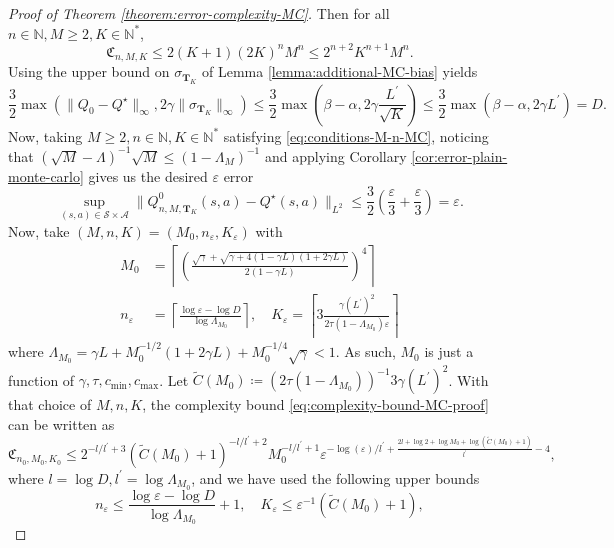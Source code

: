 \documentclass[11pt]{article}
\numberwithin{equation}{section}
\theoremstyle{definition}
\theoremstyle{remark}
\def\cA{\mathcal{A}}
\def\cS{\mathcal{S}}
\def\N{{\mathbb{N}}}
\begin{document}
\begin{proof}[Proof of Theorem \ref{theorem:error-complexity-MC}]
Then for all $n \in \N,M \geq 2, K \in \N^*$,
    \begin{equation}
    \label{eq:complexity-bound-MC-proof}
    \mathfrak C_{n,M,K} \leq 2(K + 1)(2 K)^n M^n \leq 2^{n+2}K^{n + 1}M^{n}.
    \end{equation}
     Using the upper bound on $\sigma_{\mathbf T_K}$ of Lemma \ref{lemma:additional-MC-bias} yields
    \[
\frac{3}{2}\max\left( \| Q_0 - Q^\star\|_{\infty},  2\gamma \| \sigma_{\mathbf T_K} \|_{\infty} \right) \leq \frac{3}{2} \max \left( \beta - \alpha, 2 \gamma \frac{L^\prime}{\sqrt{K}} \right) \leq \frac{3}{2} \max \left( \beta - \alpha, 2 \gamma L^\prime \right) = D.
    \]
    Now, taking $M \geq 2, n \in \N, K \in \N^*$ satisfying \eqref{eq:conditions-M-n-MC}, noticing that $(\sqrt{M} - \Lambda)^{-1}\sqrt{M} \leq (1 - \Lambda_M)^{-1}$ and applying Corollary \ref{cor:error-plain-monte-carlo} gives us the desired $\varepsilon$ error
    \[
    \sup_{(s,a) \in \cS \times \cA} \| Q^0_{n,M, \mathbf{T}_{K}}(s,a) - Q^\star(s,a) \|_{L^2} \leq \frac{3}{2}\left(\frac{\varepsilon}{3} + \frac{\varepsilon}{3}\right) =\varepsilon.
    \]
    Now, take $(M,n,K) = (M_0,n_\varepsilon,K_\varepsilon)$ with
    \[
    \begin{aligned}
        M_0 &= \left\lceil \left(\frac{\sqrt{\gamma} + \sqrt{\gamma + 4(1 - \gamma L)(1 + 2\gamma L)}}{2(1- \gamma L)} \right)^4 \right\rceil \\
        n_\varepsilon &= \left\lceil  \frac{\log \varepsilon - \log D}{\log \Lambda_{M_0}}\right\rceil, \quad  
        K_\varepsilon = \left\lceil 3 \frac{\gamma (L^\prime)^2}{2 \tau (1 - \Lambda_{M_0}) \varepsilon} \right\rceil
    \end{aligned}
    \]
    where $\Lambda_{M_0} = \gamma L + M_0^{-1/2}(1 + 2 \gamma L) + M_0^{-1/4}\sqrt{\gamma} < 1$. 
    As such, $M_0$ is just a function of $\gamma, \tau, c_{\min}, c_{\max}$.
    Let $\tilde{C}(M_0) \coloneqq  (2\tau(1 - \Lambda_{M_0}))^{-1}3\gamma (L^\prime)^2 $. 
    With that choice of $M,n,K$, the complexity bound \eqref{eq:complexity-bound-MC-proof} can be written as
    \[
    \mathfrak C_{n_0,M_0,K_0} \leq 2^{-l/l^\prime + 3}(\tilde{C}(M_0)+1)^{-l / l^\prime + 2}M_0^{-l / l^\prime + 1}
    \varepsilon^{- \log(\varepsilon) / l^\prime + \frac{2l + \log 2 + \log M_0 + \log (\tilde{C}(M_0) + 1)}{l^\prime} - 4},
    \]
    where $l = \log D, l^\prime = \log \Lambda_{M_{0}}$, and we have used the following upper bounds 
    \[
        n_{\varepsilon} \leq \frac{\log \varepsilon - \log D}{\log \Lambda_{M_0}} + 1, \quad K_{\varepsilon} \leq \varepsilon^{-1}\left(\tilde{C}(M_0) + 1\right),
\]
\end{proof}
\end{document}
